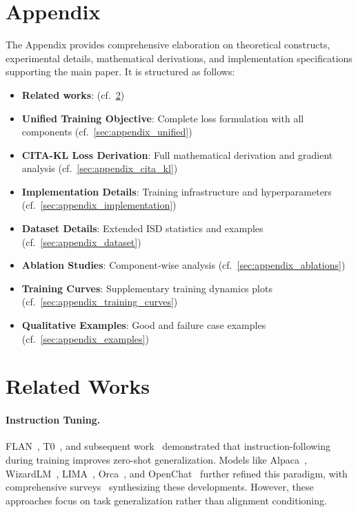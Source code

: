 
\newpage
\appendix
\section{Appendix}
\label{sec:appendix}

The Appendix provides comprehensive elaboration on theoretical constructs, experimental details, mathematical derivations, and implementation specifications supporting the main paper. It is structured as follows:

\begin{itemize}[leftmargin=*,itemsep=2pt]
    \item \textbf{Related works}: (cf.~\cref{sec:appendix_related})
    \item \textbf{Unified Training Objective}: Complete loss formulation with all components (cf.~\cref{sec:appendix_unified})
    \item \textbf{CITA-KL Loss Derivation}: Full mathematical derivation and gradient analysis (cf.~\cref{sec:appendix_cita_kl})
    \item \textbf{Implementation Details}: Training infrastructure and hyperparameters (cf.~\cref{sec:appendix_implementation})
    \item \textbf{Dataset Details}: Extended ISD statistics and examples (cf.~\cref{sec:appendix_dataset})
    \item \textbf{Ablation Studies}: Component-wise analysis (cf.~\cref{sec:appendix_ablations})
    \item \textbf{Training Curves}: Supplementary training dynamics plots (cf.~\cref{sec:appendix_training_curves})
    \item \textbf{Qualitative Examples}: Good and failure case examples (cf.~\cref{sec:appendix_examples})
\end{itemize}



\vspace{-3mm}
\section{Related Works}
\label{sec:appendix_related}

\paragraph{Instruction Tuning.} FLAN~\cite{wei2022finetuned,chung2022scaling,longpre2023flan}, T0~\cite{sanh2022multitask}, and subsequent work~\cite{wang2023self,iyer2022opt,mishra2022cross} demonstrated that instruction-following during training improves zero-shot generalization. Models like Alpaca~\cite{taori2023alpaca}, WizardLM~\cite{xu2023wizardlm}, LIMA~\cite{zhou2023lima}, Orca~\cite{mukherjee2023orca}, and OpenChat~\cite{wang2023openchat} further refined this paradigm, with comprehensive surveys~\cite{peng2023instruction} synthesizing these developments. However, these approaches focus on task generalization rather than alignment conditioning.

